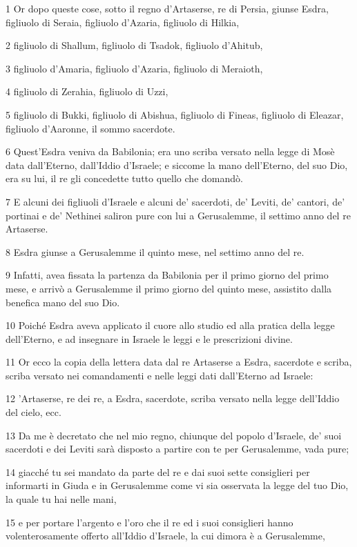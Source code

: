 \par 1 Or dopo queste cose, sotto il regno d'Artaserse, re di Persia, giunse Esdra, figliuolo di Seraia, figliuolo d'Azaria, figliuolo di Hilkia,
\par 2 figliuolo di Shallum, figliuolo di Tsadok, figliuolo d'Ahitub,
\par 3 figliuolo d'Amaria, figliuolo d'Azaria, figliuolo di Meraioth,
\par 4 figliuolo di Zerahia, figliuolo di Uzzi,
\par 5 figliuolo di Bukki, figliuolo di Abishua, figliuolo di Fineas, figliuolo di Eleazar, figliuolo d'Aaronne, il sommo sacerdote.
\par 6 Quest'Esdra veniva da Babilonia; era uno scriba versato nella legge di Mosè data dall'Eterno, dall'Iddio d'Israele; e siccome la mano dell'Eterno, del suo Dio, era su lui, il re gli concedette tutto quello che domandò.
\par 7 E alcuni dei figliuoli d'Israele e alcuni de' sacerdoti, de' Leviti, de' cantori, de' portinai e de' Nethinei saliron pure con lui a Gerusalemme, il settimo anno del re Artaserse.
\par 8 Esdra giunse a Gerusalemme il quinto mese, nel settimo anno del re.
\par 9 Infatti, avea fissata la partenza da Babilonia per il primo giorno del primo mese, e arrivò a Gerusalemme il primo giorno del quinto mese, assistito dalla benefica mano del suo Dio.
\par 10 Poiché Esdra aveva applicato il cuore allo studio ed alla pratica della legge dell'Eterno, e ad insegnare in Israele le leggi e le prescrizioni divine.
\par 11 Or ecco la copia della lettera data dal re Artaserse a Esdra, sacerdote e scriba, scriba versato nei comandamenti e nelle leggi dati dall'Eterno ad Israele:
\par 12 'Artaserse, re dei re, a Esdra, sacerdote, scriba versato nella legge dell'Iddio del cielo, ecc.
\par 13 Da me è decretato che nel mio regno, chiunque del popolo d'Israele, de' suoi sacerdoti e dei Leviti sarà disposto a partire con te per Gerusalemme, vada pure;
\par 14 giacché tu sei mandato da parte del re e dai suoi sette consiglieri per informarti in Giuda e in Gerusalemme come vi sia osservata la legge del tuo Dio, la quale tu hai nelle mani,
\par 15 e per portare l'argento e l'oro che il re ed i suoi consiglieri hanno volenterosamente offerto all'Iddio d'Israele, la cui dimora è a Gerusalemme,
